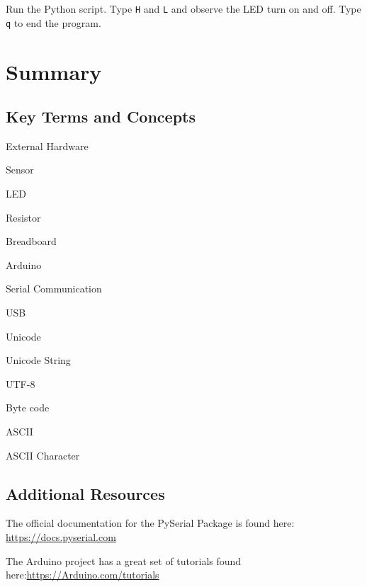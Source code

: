 \documentclass{book}
\newenvironment{key_terms}{\begin{multicols}{3}}{\end{multicols}} %
\begin{document}
    
        Run the Python script. Type \lstinline!H! and \lstinline!L! and observe
the LED turn on and off. Type \lstinline!q! to end the program.
    




    
        \newpage
        \section{Summary}\label{summary}

    




    
        \subsection{Key Terms and Concepts}\label{key-terms-and-concepts}
    




    
        \begin{key_terms}
        External Hardware

Sensor

LED

Resistor

Breadboard

Arduino

Serial Communication

USB

Unicode

Unicode String

UTF-8

Byte code

ASCII

ASCII Character
        \end{key_terms}

    




    
        \subsection{Additional Resources}\label{additional-resources}

The official documentation for the PySerial Package is found here:
\protect\hyperlink{}{https://docs.pyserial.com}

The Arduino project has a great set of tutorials found
here:\protect\hyperlink{}{https://Arduino.com/tutorials}
\end{document}
